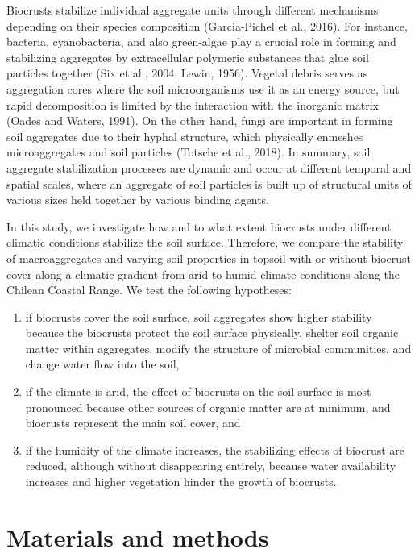 {Biocrusts stabilize individual aggregate units through different mechanisms depending on their species composition (Garcia-Pichel et al., 2016). For instance, bacteria, cyanobacteria, and also green-algae play a crucial role in forming and stabilizing aggregates by extracellular polymeric substances that glue soil particles together  (Six et al., 2004; Lewin, 1956). Vegetal debris serves as aggregation cores where the soil microorganisms use it as an energy source, but rapid decomposition is limited by the interaction with the inorganic matrix (Oades and Waters, 1991). On the other hand, fungi are important in forming soil aggregates due to their hyphal structure, which physically enmeshes microaggregates and soil particles (Totsche et al., 2018). In summary, soil aggregate stabilization processes are dynamic and occur at different temporal and spatial scales, where an aggregate of soil particles is built up of structural units of various sizes held together by various binding agents.

In this study, we investigate how and to what extent biocrusts under different climatic conditions stabilize the soil surface. Therefore, we compare the stability of macroaggregates and varying soil properties in topsoil with or without biocrust cover along a climatic gradient from arid to humid climate conditions along the Chilean Coastal Range. We test the following hypotheses:

\begin{enumerate}[label=(\roman*)] %
    \item if biocrusts cover the soil surface, soil aggregates show higher stability because the biocrusts protect the soil surface physically, shelter soil organic matter within aggregates, modify the structure of microbial communities, and change water flow into the soil,

    \item if the climate is arid, the effect of biocrusts on the soil surface is most pronounced because other sources of organic matter are at minimum, and biocrusts represent the main soil cover, and

    \item if the humidity of the climate increases, the stabilizing effects of biocrust are reduced, although without disappearing entirely, because water availability increases and higher vegetation hinder the growth of biocrusts.
\end{enumerate}

\section{Materials and methods}
}
